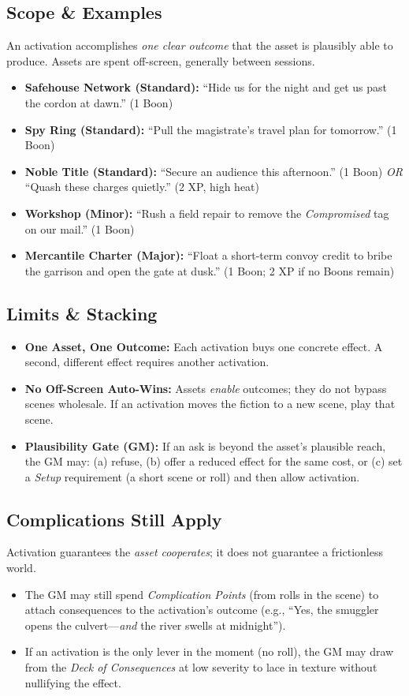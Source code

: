 \documentclass[12pt]{article}
\begin{document}
\subsection*{Scope \& Examples}
An activation accomplishes \emph{one clear outcome} that the asset is plausibly able to produce. Assets are spent off-screen, generally between sessions.
\begin{itemize}
  \item \textbf{Safehouse Network (Standard):} ``Hide us for the night and get us past the cordon at dawn.'' (1 Boon)
  \item \textbf{Spy Ring (Standard):} ``Pull the magistrate’s travel plan for tomorrow.'' (1 Boon)
  \item \textbf{Noble Title (Standard):} ``Secure an audience this afternoon.'' (1 Boon) \emph{OR} ``Quash these charges quietly.'' (2 XP, high heat)
  \item \textbf{Workshop (Minor):} ``Rush a field repair to remove the \emph{Compromised} tag on our mail.'' (1 Boon)
  \item \textbf{Mercantile Charter (Major):} ``Float a short-term convoy credit to bribe the garrison and open the gate at dusk.'' (1 Boon; 2 XP if no Boons remain)
\end{itemize}

\subsection*{Limits \& Stacking}
\begin{itemize}
  \item \textbf{One Asset, One Outcome:} Each activation buys one concrete effect. A second, different effect requires another activation.
  \item \textbf{No Off-Screen Auto-Wins:} Assets \emph{enable} outcomes; they do not bypass scenes wholesale. If an activation moves the fiction to a new scene, play that scene.
  \item \textbf{Plausibility Gate (GM):} If an ask is beyond the asset’s plausible reach, the GM may: (a) refuse, (b) offer a reduced effect for the same cost, or (c) set a \emph{Setup} requirement (a short scene or roll) and then allow activation.
\end{itemize}

\subsection*{Complications Still Apply}
Activation guarantees the \emph{asset cooperates}; it does not guarantee a frictionless world.
\begin{itemize}
  \item The GM may still spend \emph{Complication Points} (from rolls in the scene) to attach consequences to the activation’s outcome (e.g., ``Yes, the smuggler opens the culvert—\emph{and} the river swells at midnight'').
  \item If an activation is the only lever in the moment (no roll), the GM may draw from the \emph{Deck of Consequences} at low severity to lace in texture without nullifying the effect.
\end{itemize}
\end{document}
